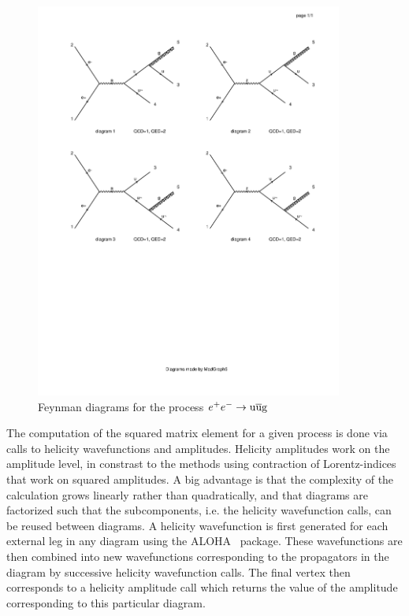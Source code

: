 \begin{figure}
  \centering
  \includegraphics[width=0.9\textwidth, clip=true, trim=1cm 10.5cm 1cm 2cm]
{figures/eventreco_generation/matrix1}
  \caption{Feynman diagrams for the process $e^+ e^- \rightarrow \mathrm{u} \overline{\mathrm{u}} \mathrm{g}$
  \label{fig:madgraph_diagrams}}
\end{figure}

The computation of the squared matrix element for a given process is done via calls to helicity
wavefunctions and amplitudes. Helicity amplitudes work on the amplitude level, in constrast to the
methods using contraction of Lorentz-indices that work on squared amplitudes.  A big advantage is
that the complexity of the calculation grows linearly rather than quadratically, and that diagrams
are factorized such that the subcomponents, i.e. the helicity wavefunction calls, can be reused
between diagrams. 
A helicity wavefunction is first generated for each external leg in any diagram using the
\textsc{ALOHA}~\cite{deAquino:2011ub} package. 
These wavefunctions are then combined into new wavefunctions corresponding to the propagators in the
diagram by successive helicity wavefunction calls. The final vertex then corresponds to a helicity
amplitude call which returns the value of the amplitude corresponding to this particular diagram.

